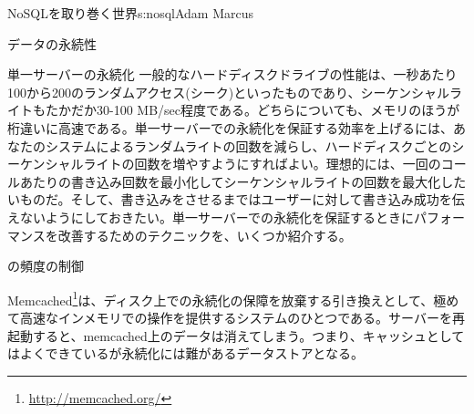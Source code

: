 \begin{aosachapter}{NoSQLを取り巻く世界}{s:nosql}{Adam Marcus}
\begin{aosasect1}{データの永続性}
\begin{aosasect2}{単一サーバーの永続化}
一般的なハードディスクドライブの性能は、一秒あたり100から200のランダムアクセス(シーク)といったものであり、シーケンシャルライトもたかだか30-100 MB/sec程度である。どちらについても、メモリのほうが桁違いに高速である。単一サーバーでの永続化を保証する効率を上げるには、あなたのシステムによるランダムライトの回数を減らし、ハードディスクごとのシーケンシャルライトの回数を増やすようにすればよい。理想的には、一回のコールあたりの書き込み回数を最小化してシーケンシャルライトの回数を最大化したいものだ。そして、書き込みをさせるまではユーザーに対して書き込み成功を伝えないようにしておきたい。単一サーバーでの永続化を保証するときにパフォーマンスを改善するためのテクニックを、いくつか紹介する。

\begin{aosasect3}{の頻度の制御}

Memcached\footnote{\url{http://memcached.org/}}は、ディスク上での永続化の保障を放棄する引き換えとして、極めて高速なインメモリでの操作を提供するシステムのひとつである。サーバーを再起動すると、memcached上のデータは消えてしまう。つまり、キャッシュとしてはよくできているが永続化には難があるデータストアとなる。


\end{aosasect3}
\end{aosasect2}
\end{aosasect1}
\end{aosachapter}
